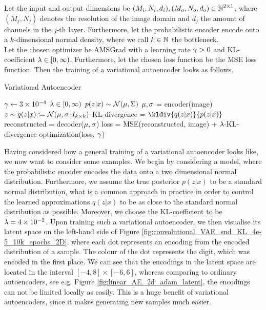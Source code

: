\begin{algorithm}
Let the input and output dimensions be $(M_i,N_i, d_i), (M_o,N_o,d_o) \in \operatorname{\mathbb{N}}^{2\times 1}$, where $(M_j, N_j)$ denotes the resolution of the image domain and $d_j$ the amount of channels in the $j$-th layer. Furthermore, let the probabilistic encoder encode onto a $k$-dimensional normal density, where we call $k\in\operatorname{\mathbb{N}}$ the bottleneck.\\
Let the chosen optimizer be AMSGrad with a learning rate $\operatorname{\gamma}>0$ and KL-coefficient $\lambda\in[0,\infty)$. Furthermore, let the chosen loss function be the MSE loss function. Then the training of a variational autoencoder looks as follows.
\caption{Variational Autoencoder}\label{alg:general_vae}
\begin{algorithmic}[1]
\Require $\operatorname{\gamma} \gets \num{3e-4}$ 
\Require $\lambda \in [0,\infty)$ 
\Require $p(z|x) \sim \mathcal{N}(\operatorname{\mu},\Sigma)$ 
	    \State $\operatorname{\mu}, \operatorname{\sigma}$ = encoder(image) 
	    \State $z\sim q(z|x) \coloneqq\mathcal{N}(\operatorname{\mu}, \operatorname{\sigma}\cdot I_{k\times k})$ 
    	\State KL-divergence = $\kldiv{q(z|x)}{p(z|x)}$ 
		\State reconstructed = decoder($\operatorname{\mu}, \operatorname{\sigma}$) 
    	\State loss = MSE(reconstructed, image) + $\lambda\cdot$KL-divergence 
	    \State optimization(loss, $\operatorname{\gamma}$) 
    \EndFor
\EndFor
\end{algorithmic}
\end{algorithm}

Having considered how a general training of a variational autoencoder looks like, we now want to consider some examples. We begin by considering a model, where the probabilistic encoder encodes the data onto a two dimensional normal distribution. Furthermore, we assume the true posterior $p(z|x)$ to be a standard normal distribution, what is a common approach in practice in order to control the learned approximations $q(z|x)$ to be as close to the standard normal distribution as possible. Moreover, we choose the KL-coefficient to be $\lambda=\num{4e-2}$. Upon training such a variational autoencoder, we then visualise its latent space on the left-hand side of Figure \ref{fig:convolutional_VAE_snd_KL_4e-5_10k_epochs_2D}, where each dot represents an encoding from the encoded distribution of a sample. The colour of the dot represents the digit, which was encoded in the first place. We can see that the encodings in the latent space are located in the interval $[-4, 8]\times [-6, 6]$, whereas comparing to ordinary autoencoders, see e.g. Figure \ref{fig:linear_AE_2d_adam_latent}, the encodings can not be limited locally as easily. This is a huge benefit of variational autoencoders, since it makes generating new samples much easier.

